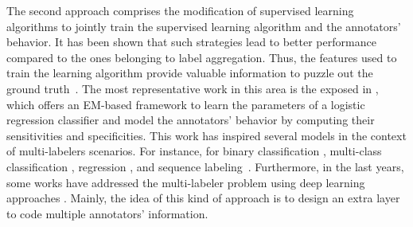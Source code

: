 \documentclass[journal]{IEEEtran}
\begin{document}
The second approach comprises the modification of supervised learning
algorithms to jointly train the supervised learning algorithm and the
annotators' behavior. It has been shown that such strategies lead to
better performance compared to the ones belonging to label
aggregation. Thus, the features used to train the learning algorithm
provide valuable information to puzzle out the ground
truth~\cite{ruiz2019learning}. The most representative work in this
area is the exposed in \cite{raykar2010learning}, which offers an
EM-based framework to learn the parameters of a logistic regression
classifier and model the annotators' behavior by computing their
sensitivities and specificities. This work has inspired several models
in the context of multi-labelers scenarios. For instance, for binary
classification \cite{rodrigues2014gaussian,ruiz2019learning},
multi-class classification
\cite{morales2019scalable,gonzalez2015automatic}, regression
\cite{groot2011learning,rodrigues2017learning}, and sequence
labeling~\cite{rodrigues2014sequence}. Furthermore, in the last years,
some works have addressed the multi-labeler problem using deep
learning approaches
\cite{albarqouni2016aggnet,rodrigues2018deep,guan2018said}. Mainly,
the idea of this kind of approach is to design an extra layer to code
multiple annotators' information.
\end{document}
